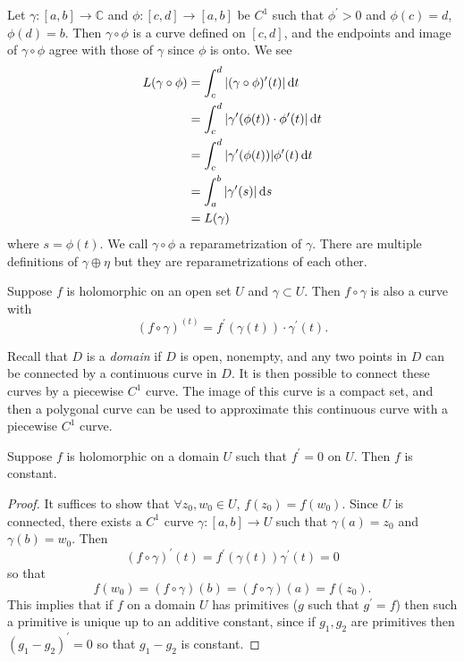 Let $\gamma : [a, b] \to \mathbb{C}$ and
$\phi : [c, d] \to [a, b]$ be $C^1$ such that
$\phi^\prime > 0$ and $\phi(c) = d$, $\phi(d) = b$.
Then $\gamma \circ \phi$ is a curve defined on
$[c, d]$, and the endpoints and image of
$\gamma \circ \phi$ agree with those of $\gamma$
since $\phi$ is onto. We see
\begin{align*}
   L(\gamma \circ \phi)
&= \int_c^d |(\gamma \circ \phi)^\prime(t)| \mathop{}\!\mathrm{d} t \\
&= \int_c^d |\gamma^{\prime}(\phi(t)) \cdot \phi^\prime(t)| \mathop{}\!\mathrm{d} t \\
&= \int_c^d |\gamma^\prime(\phi(t))| \phi^\prime(t) \mathop{}\!\mathrm{d} t \\
&= \int_a^b |\gamma^\prime(s)| \mathop{}\!\mathrm{d} s \\
&= L(\gamma)
\end{align*}
where $s = \phi(t)$. We call $\gamma \circ \phi$ a reparametrization
of $\gamma$. There are multiple definitions of $\gamma \oplus \eta$
but they are reparametrizations of each other.

Suppose $f$ is holomorphic on an open set $U$ and $\gamma \subset U$.
Then $f \circ \gamma$ is also a curve with
$$
(f \circ \gamma)^(t) = f^\prime(\gamma(t)) \cdot \gamma^\prime(t).
$$

Recall that $D$ is a \emph{domain} if $D$ is open, nonempty, and
any two points in $D$ can be connected by a continuous
curve in $D$. It is then possible to connect these curves by
a piecewise $C^1$ curve. The image of this curve is a compact
set, and then a polygonal curve can be used to approximate this
continuous curve with a piecewise $C^1$ curve.

\begin{theorem}
  Suppose $f$ is holomorphic on a domain $U$ such that
  $f^\prime = 0$ on $U$. Then $f$ is constant.
\end{theorem}

\begin{proof}
It suffices to show that $\forall z_0, w_0 \in U$,
$f(z_0) = f(w_0)$. Since $U$ is connected, there exists a
$C^1$ curve $\gamma: [a, b] \to U$ such that
$\gamma(a) = z_0$ and $\gamma(b) = w_0$. Then
$$
  (f \circ \gamma)^\prime(t)
= f^\prime(\gamma(t)) \gamma^{\prime}(t)
= 0
$$
so that
$$
f(w_0) = (f \circ \gamma)(b) = (f \circ \gamma)(a) = f(z_0).
$$
This implies that if $f$ on a domain $U$ has primitives
($g$ such that $g^\prime = f$) then such a primitive is unique
up to an additive constant, since if $g_1, g_2$ are primitives
then $(g_1 - g_2)^\prime = 0$ so that $g_1 - g_2$ is constant.
\end{proof}

